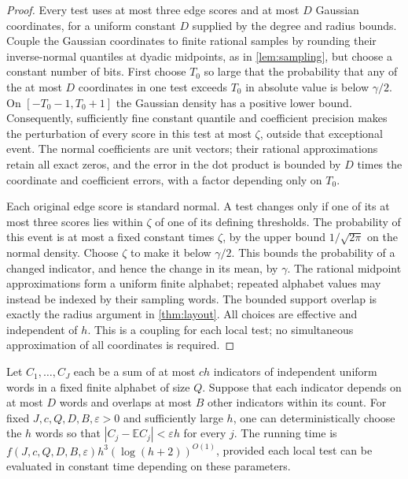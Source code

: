\documentclass[11pt]{article}
\theoremstyle{plain}
\theoremstyle{definition}
\theoremstyle{remark}
\begin{document}
\begin{proof}
Every test uses at most three edge scores and at most $D$ Gaussian coordinates, for a uniform
constant $D$ supplied by the degree and radius bounds. Couple the Gaussian coordinates to
finite rational samples by rounding their inverse-normal quantiles at dyadic midpoints, as
in \cref{lem:sampling}, but choose a constant number of bits. First choose $T_0$ so large that
the probability that any of the at most $D$ coordinates in one test exceeds $T_0$ in absolute
value is below $\gamma/2$. On $[-T_0-1,T_0+1]$ the Gaussian density has a positive lower bound.
Consequently, sufficiently fine constant quantile and coefficient precision makes the
perturbation of every score in this test at most $\zeta$, outside that exceptional event.
The normal coefficients are unit vectors; their rational approximations retain all exact
zeros, and the error in the dot product is bounded by $D$ times the coordinate and coefficient
errors, with a factor depending only on $T_0$.

Each original edge score is standard normal. A test changes only if one of its at most three
scores lies within $\zeta$ of one of its defining thresholds. The probability of this event is
at most a fixed constant times $\zeta$, by the upper bound $1/\sqrt{2\pi}$ on the normal density.
Choose $\zeta$ to make it below $\gamma/2$. This bounds the probability of a changed indicator,
and hence the change in its mean, by $\gamma$. The rational midpoint approximations form a
uniform finite alphabet; repeated alphabet values may instead be indexed by their sampling
words. The bounded support overlap is exactly the radius argument in \cref{thm:layout}.
All choices are effective and independent of $h$. This is a coupling for each local test;
no simultaneous approximation of all coordinates is required.
\end{proof}

\begin{lemma}
\label{lem:local-moments}
Let $C_1,\ldots,C_J$ each be a sum of at most $ch$ indicators of independent uniform words in
a fixed finite alphabet of size $Q$. Suppose that each indicator depends on at most $D$ words
and overlaps at most $B$ other indicators within its count. For fixed $J,c,Q,D,B,\varepsilon>0$
and sufficiently large $h$, one can deterministically choose the $h$ words so that
$|C_j-\mathbb E C_j|<\varepsilon h$ for every $j$. The running time is
$f(J,c,Q,D,B,\varepsilon)h^3(\log(h+2))^{O(1)}$, provided each local test can be evaluated in
constant time depending on these parameters.
\end{lemma}
\end{document}
